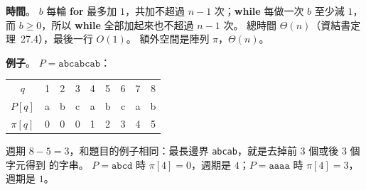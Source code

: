 \begin{pastsoln}
\textbf{時間}。 $b$ 每輪 \textbf{for} 最多加 $1$，共加不超過 $n - 1$ 次；\textbf{while} 每做一次
$b$ 至少減 $1$，而 $b \ge 0$，所以 \textbf{while} 全部加起來也不超過 $n - 1$ 次。 總時間
$\Theta(n)$（資結書定理~27.4），最後一行 $O(1)$。 額外空間是陣列 $\pi$，$\Theta(n)$。

\textbf{例子}。 $P = \mathtt{abcabcab}$：
\begin{center}
\begin{tabular}{c*{8}{c}}
\toprule
$q$ & 1 & 2 & 3 & 4 & 5 & 6 & 7 & 8 \\
$P[q]$ & a & b & c & a & b & c & a & b \\
$\pi[q]$ & 0 & 0 & 0 & 1 & 2 & 3 & 4 & 5 \\
\bottomrule
\end{tabular}
\end{center}
週期 $8 - 5 = 3$，和題目的例子相同：最長邊界 \texttt{abcab}，就是去掉前 $3$ 個或後 $3$ 個字元得到
的字串。 $P = \mathtt{abcd}$ 時 $\pi[4] = 0$，週期是 $4$；$P = \mathtt{aaaa}$ 時 $\pi[4] = 3$，
週期是 $1$。
\end{pastsoln}
